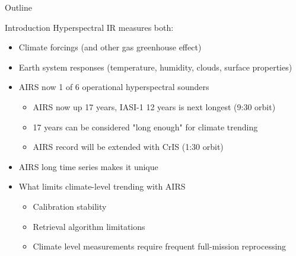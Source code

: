 \documentclass[presentation]{beamer}
\author{L. Larrabee Strow}
\date{\today}
\title{}
\begin{document}
\begin{frame}{Outline}
\tableofcontents
\end{frame}

\begin{frame}[label={sec:orgcc2b12e}]{Introduction}
Hyperspectral IR measures both:
\begin{itemize}
\item Climate forcings (\cd and other gas greenhouse effect)
\item Earth system responses (temperature, humidity, clouds, surface properties)
\end{itemize}
\begin{itemize}
\item AIRS now 1 of 6 operational hyperspectral sounders
\begin{itemize}
\item AIRS now up 17 years, IASI-1 12 years is next longest (9:30 orbit)
\item 17 years can be considered "long enough" for climate trending
\item AIRS record will be extended with CrIS (1:30 orbit)
\end{itemize}

\item AIRS long time series makes it unique
\item What limits climate-level trending with AIRS
\begin{itemize}
\item Calibration stability
\item Retrieval algorithm limitations
\item Climate level measurements require frequent full-mission reprocessing
\end{itemize}
\end{itemize}
\end{frame}
\end{document}
